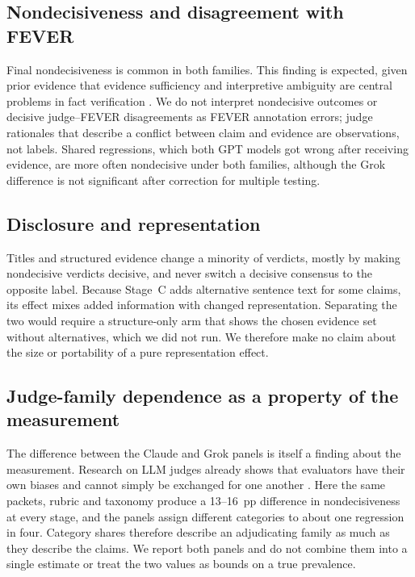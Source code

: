 \subsection{Nondecisiveness and disagreement with FEVER}
Final nondecisiveness is common in both families.
This finding is expected, given prior evidence that evidence sufficiency and interpretive ambiguity are central problems in fact verification \citep{atanasova-etal-2022-fact,glockner-etal-2024-ambifc}.
We do not interpret nondecisive outcomes or decisive judge--FEVER disagreements as FEVER annotation errors; judge rationales that describe a conflict between claim and evidence are observations, not labels.
Shared regressions, which both GPT models got wrong after receiving evidence, are more often nondecisive under both families, although the Grok difference is not significant after correction for multiple testing.

\subsection{Disclosure and representation}
Titles and structured evidence change a minority of verdicts, mostly by making nondecisive verdicts decisive, and never switch a decisive consensus to the opposite label.
Because Stage~C adds alternative sentence text for some claims, its effect mixes added information with changed representation.
Separating the two would require a structure-only arm that shows the chosen evidence set without alternatives, which we did not run.
We therefore make no claim about the size or portability of a pure representation effect.

\subsection{Judge-family dependence as a property of the measurement}
The difference between the Claude and Grok panels is itself a finding about the measurement.
Research on LLM judges already shows that evaluators have their own biases and cannot simply be exchanged for one another \citep{zheng2023judging,liu-etal-2023-g,chen-etal-2024-humans,huang-etal-2025-empirical}.
Here the same packets, rubric and taxonomy produce a 13--16~pp difference in nondecisiveness at every stage, and the panels assign different categories to about one regression in four.
Category shares therefore describe an adjudicating family as much as they describe the claims.
We report both panels and do not combine them into a single estimate or treat the two values as bounds on a true prevalence.

